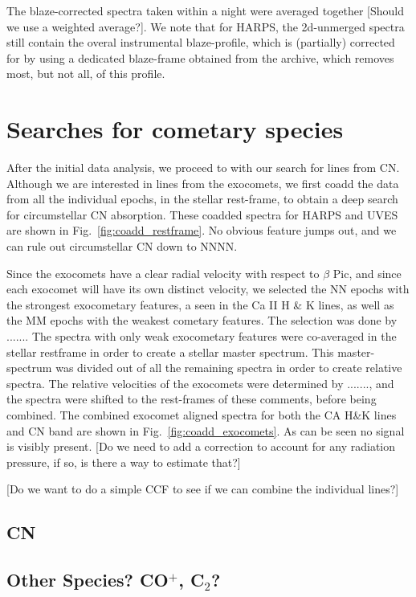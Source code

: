 \documentclass{aa}
\begin{document}
The blaze-corrected spectra taken within a night were averaged together [Should we use a weighted average?]. We note that for HARPS, the 2d-unmerged spectra still contain the overal instrumental blaze-profile, which is (partially) corrected for by using a dedicated blaze-frame obtained from the archive, which removes most, but not all, of this profile. 

\section{Searches for cometary species}
After the initial data analysis, we proceed to with our search for lines from CN. Although we are interested in lines from the exocomets, we first coadd the data from all the individual epochs, in the stellar rest-frame, to obtain a deep search for circumstellar CN absorption. These coadded spectra for HARPS and UVES are shown in Fig.~\ref{fig:coadd_restframe}. No obvious feature jumps out, and we can rule out circumstellar CN down to NNNN.

Since the exocomets have a clear radial velocity with respect to $\beta$ Pic, and since each exocomet will have its own distinct velocity, we selected the NN epochs with the strongest exocometary features, a seen in the Ca II H \& K lines, as well as the MM epochs with the weakest cometary features. The selection was done by .......
The spectra with only weak exocometary features were co-averaged in the stellar restframe in order to create a stellar master spectrum. This master-spectrum was divided out of all the remaining spectra in order to create relative spectra. 
The relative velocities of the exocomets were determined by ......., and the spectra were shifted to the rest-frames of these comments, before being combined. The combined exocomet aligned spectra for both the CA H\&K lines and CN band are shown in Fig.~\ref{fig:coadd_exocomets}. As can be seen no signal is visibly present. [Do we need to add a correction to account for any radiation pressure, if so, is there a way to estimate that?]

[Do we want to do a simple CCF to see if we can combine the individual lines?]


\subsection{CN}

\subsection{Other Species? CO$^+$, C$_2$?}
\end{document}
